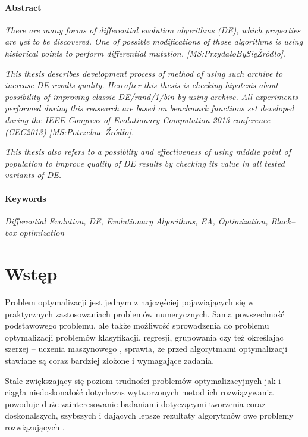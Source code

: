 \documentclass[12pt,a4paper]{report}
\begin{document}
\subsubsection{Abstract}
\par{
\emph{There are many forms of differential evolution algorithms (DE), which properties are yet to be discovered. One of possible modifications of those algorithms is using historical points to perform differential mutation. [MS:PrzydałoBySięŹródło]}.
}
\par{
\emph{
This thesis describes development process of method of using such archive to increase DE results quality. Hereafter this thesis is checking hipotesis about possibility of improving classic DE/rand/1/bin by using archive. All experiments performed during this reasearch are based on benchmark functions set developed during the IEEE Congress of Evolutionary Computation 2013 conference (CEC2013) [MS:Potrzebne Źródło].
}
}
\par{
\emph{
This thesis also refers to a possiblity and effectiveness of using middle point of population to improve quality of DE results by checking its value in all tested variants of DE. 
}
}
\subsubsection{Keywords}
\par{
\emph{Differential Evolution, DE, Evolutionary Algorithms, EA, Optimization, Black--box optimization}
}


\chapter{Wstęp}
\par{
Problem optymalizacji jest jednym z najczęściej pojawiających się w praktycznych zastosowaniach problemów numerycznych. Sama powszechność podstawowego problemu, ale także możliwość sprowadzenia do problemu optymalizacji problemów klasyfikacji, regresji, grupowania czy też określając szerzej -- uczenia maszynowego \cite{SearchingInteligent,SpringerIntroToEvol}, sprawia, że przed algorytmami optymalizacji stawiane są coraz bardziej złożone i wymagające zadania.
}
\par{
Stale zwiększający się poziom trudności problemów optymalizacyjnych jak i ciągła niedoskonałość dotychczas wytworzonych metod ich rozwiązywania powoduje duże zainteresowanie badaniami dotyczącymi tworzenia coraz doskonalszych, szybszych i dających lepsze rezultaty algorytmów owe problemy rozwiązujących \cite{StateOfArt}.
}
\end{document}
